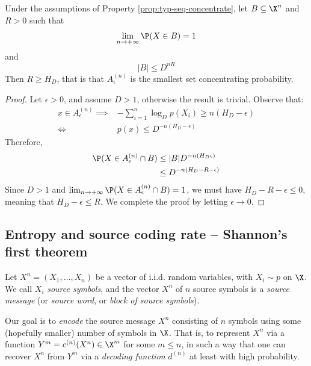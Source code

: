 \documentclass[toc, titlepaged]{../cs-classes/cs-classes}
\begin{document}
\begin{property}
    \label{prop:a-eps-smallest}
    Under the assumptions of Property \ref{prop:typ-seq-concentrate}, let $B\subseteq \X^n$ and $R>0$ such that
    \begin{equation*}
        \lim_{n\to+\infty}\P(X\in B)=1
    \end{equation*}
    and
    \begin{equation*}
        |B|\leq D^{nR}
    \end{equation*}
    Then $R\geq H_D$, that is that $A_\epsilon^{(n)}$ is the smallest set concentrating probability.
\end{property}

\begin{proof}
    Let $\epsilon>0$, and assume $D>1$, otherwise the result is trivial. Observe that:
    \begin{equation*}
        \begin{aligned}
            x\in A_\epsilon^{(n)}\implies&-\sum_{i=1}^n \log_D p(X_i)\geq n(H_D-\epsilon)\\
            \iff& p(x)\leq D^{-n(H_D-\epsilon)}
        \end{aligned}
    \end{equation*}
    Therefore,
    \begin{equation*}
        \begin{aligned}
            \P(X\in A_\epsilon^{(n)}\cap B)&\leq |B|D^{-n(H_D\epsilon)}\\
            &\leq D^{-n(H_D-R-\epsilon)}
        \end{aligned}
    \end{equation*}
    Since $D>1$ and $\lim_{n\to+\infty}\P(X\in A_\epsilon^{(n)}\cap B)=1$, we must have $H_D-R-\epsilon\leq 0$, meaning that $H_D-\epsilon\leq R$. We complete the proof by letting $\epsilon\to 0$. 
\end{proof}

\subsection{Entropy and source coding rate -- Shannon's first theorem}
\begin{definition}
    Let $X^n=(X_1, \dots, X_n)$ be a vector of i.i.d. random variables, with $X_i\sim p$ on $\X$. We call $X_i$ \emph{source symbols}, and the vector $X^n$ of $n$ source symbols is a \emph{source message} (or \emph{source word}, or \emph{block of source symbols}). 

    Our goal is to \emph{encode} the source message $X^n$ consisting of $n$ symbols using some (hopefully smaller) number of symbols in $\X$. That is, to represent $X^n$ via a function $Y^m=c^{(n)}(X^n)\in \X^m$ for some $m\leq n$, in such a way that one can recover $X^n$ from $Y^m$ via a \emph{decoding function} $d^{(n)}$ at least with high probability.
\end{definition}
\end{document}

